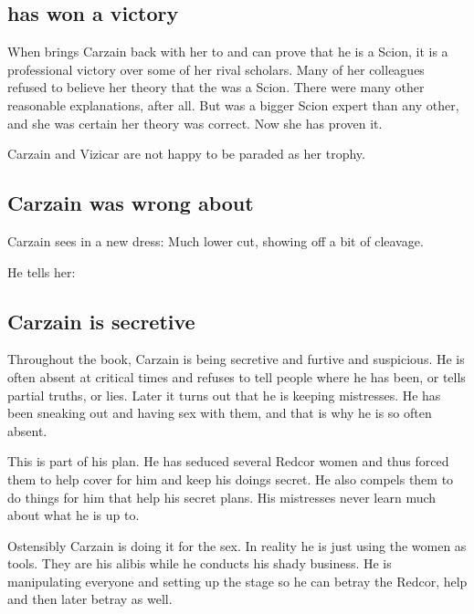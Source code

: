 \subsection{\Esmerel has won a victory}
When \Esmerel{} brings Carzain back with her to \Redce{} and can prove that he is a Scion, it is a professional victory over some of her rival scholars.
Many of her colleagues refused to believe her theory that the \spike{} was a Scion. 
There were many other reasonable explanations, after all. 
But \Esmerel{} was a bigger Scion expert than any other, and she was certain her theory was correct. 
Now she has proven it. 

Carzain and Vizicar are not happy to be paraded as her trophy. 









\subsection{Carzain was wrong about \Esmerel}
Carzain sees \Esmerel{} in a new dress: Much lower cut, showing off a bit of cleavage. 

He tells her: 









\subsection{Carzain is secretive}
Throughout the book, Carzain is being secretive and furtive and suspicious. 
He is often absent at critical times and refuses to tell people where he has been, or tells partial truths, or lies. 
Later it turns out that he is keeping mistresses. 
He has been sneaking out and having sex with them, and that is why he is so often absent. 

This is part of his plan.
He has seduced several Redcor women and thus forced them to help cover for him and keep his doings secret. 
He also compels them to do things for him that help his secret plans.
His mistresses never learn much about what he is up to.

Ostensibly Carzain is doing it for the sex. 
In reality he is just using the women as tools. 
They are his alibis while he conducts his shady business.
He is manipulating everyone and setting up the stage so he can betray the Redcor, help \Belzir and then later betray \Belzir as well.

